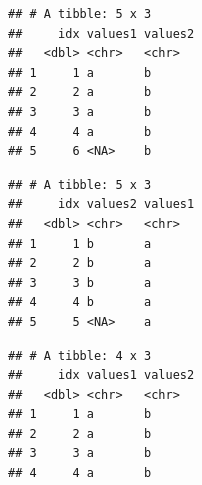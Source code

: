 \documentclass[krantz2]{krantz}\usepackage{knitr}%
\begin{document}
\begin{knitrout}\footnotesize
{}\color{fgcolor}\begin{kframe}
\begin{alltt}
\end{alltt}


{\ttfamily\noindent\itshape{}}\begin{verbatim}
## # A tibble: 5 x 3
##     idx values1 values2
##   <dbl> <chr>   <chr>  
## 1     1 a       b      
## 2     2 a       b      
## 3     3 a       b      
## 4     4 a       b      
## 5     6 <NA>    b
\end{verbatim}
\end{kframe}
\end{knitrout}

\begin{knitrout}\footnotesize
{}\color{fgcolor}\begin{kframe}
\begin{alltt}
\end{alltt}


{\ttfamily\noindent\itshape{}}\begin{verbatim}
## # A tibble: 5 x 3
##     idx values2 values1
##   <dbl> <chr>   <chr>  
## 1     1 b       a      
## 2     2 b       a      
## 3     3 b       a      
## 4     4 b       a      
## 5     5 <NA>    a
\end{verbatim}
\end{kframe}
\end{knitrout}

\begin{knitrout}\footnotesize
{}\color{fgcolor}\begin{kframe}
\begin{alltt}
\end{alltt}


{\ttfamily\noindent\itshape{}}\begin{verbatim}
## # A tibble: 4 x 3
##     idx values1 values2
##   <dbl> <chr>   <chr>  
## 1     1 a       b      
## 2     2 a       b      
## 3     3 a       b      
## 4     4 a       b
\end{verbatim}
\end{kframe}
\end{knitrout}
\end{document}
